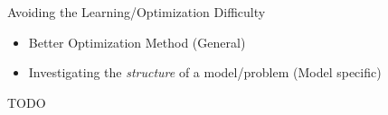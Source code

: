 \documentclass[first=dgreen,second=purple,logo=yellowexc]{aaltoslides}
\begin{document}
\begin{frame}{Avoiding the Learning/Optimization Difficulty}
    \begin{itemize}
        \item Better Optimization Method (General)
        \item Investigating the \emph{structure} of a
            model/problem (Model specific)
    \end{itemize}
\end{frame}


\begin{frame}{}
    \alert{TODO}
\end{frame}









\end{document}
